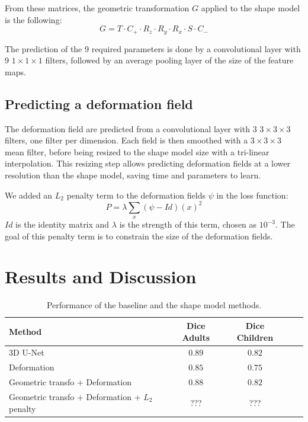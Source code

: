 From these matrices, the geometric transformation $G$ applied to the shape model is the following:
\begin{equation}
    G = T \cdot C_+ \cdot R_z \cdot R_y \cdot R_x \cdot S \cdot C_-
\end{equation}

The prediction of the 9 required parameters is done by a convolutional layer with 9 $1 \times 1 \times 1$ filters, followed by an average pooling layer of the size of the feature maps. 

\subsection{Predicting a deformation field}

The deformation field are predicted from a convolutional layer with 3 $3 \times 3 \times 3$ filters, one filter per dimension. Each field is then smoothed with a $3 \times 3 \times 3$ mean filter, before being resized to the shape model size with a tri-linear interpolation. This resizing step allows predicting deformation fields at a lower resolution than the shape model, saving time and parameters to learn.

We added an $L_2$ penalty term to the deformation fields $\psi$ in the loss function:
\begin{equation}
    P = \lambda \sum_x \left( \psi - Id \right)(x)^2
\end{equation}
$Id$ is the identity matrix and $\lambda$ is the strength of this term, chosen as $10^{-3}$. The goal of this penalty term is to constrain the size of the deformation fields.



\section{Results and Discussion}
\label{sec:seg_result}

\begin{table}[htbp]
	\centering
\begin{tabular}{|l|c|c|c|c|}
	\hline
    Method & Dice Adults & Dice Children \\
	\hline
    3D U-Net & $\bm{0.89}$ & $\bm{0.82}$ \\
    Deformation & $0.85$ & $0.75$ \\
    Geometric transfo + Deformation & $0.88$ & $\bm{0.82}$ \\
    Geometric transfo + Deformation + $L_2$ penalty & ??? & ??? \\
    \hline
\end{tabular}
	\vspace{2mm}
	\caption{Performance of the baseline and the shape model methods.}
    \label{table:seg_results}
\end{table}

